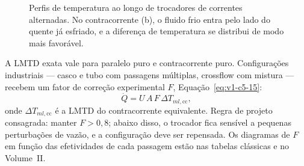 \documentclass[12pt,a4paper]{article}
\numberwithin{equation}{section}
\numberwithin{table}{section}
\numberwithin{figure}{section}
\begin{document}
\begin{figure}[H]
\centering
{}
\caption[Perfis de temperatura em trocadores de correntes alternadas.]{%
Perfis de temperatura ao longo de trocadores de correntes alternadas. No
contracorrente (b), o fluido frio entra pelo lado do quente já esfriado, e a
diferença de temperatura se distribui de modo mais favorável.}
\label{fig:v1-c5-2}
\end{figure}

A LMTD exata vale para paralelo puro e contracorrente puro. Configurações
industriais --- casco e tubo com passagens múltiplas, crossflow com
mistura --- recebem um fator de correção experimental $F$,
Equação~\eqref{eq:v1-c5-15}:
\begin{equation}\label{eq:v1-c5-15}
\dot{Q} = U \, A \, F \, \Delta T_{ml,\text{cc}},
\end{equation}
onde $\Delta T_{ml,\text{cc}}$ é a LMTD do contracorrente equivalente.
Regra de projeto consagrada: manter $F > 0{,}8$; abaixo disso, o trocador
fica sensível a pequenas perturbações de vazão, e a configuração deve ser
repensada. Os diagramas de $F$ em função das efetividades de cada passagem
estão nas tabelas clássicas e no Volume~II.
\end{document}

